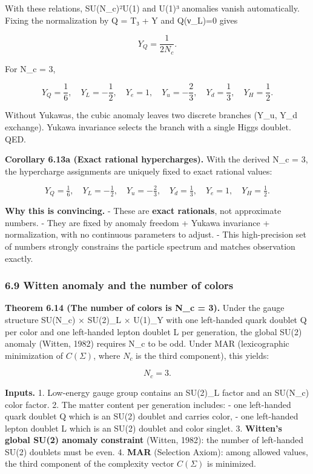 \documentclass[
]{article}
\begin{document}
With these relations, SU(N\_c)²U(1) and U(1)³ anomalies vanish
automatically. Fixing the normalization by Q = T₃ + Y and Q(ν\_L)=0
gives

\[
Y_Q = \frac{1}{2 N_c}.
\]

For N\_c = 3,

\[
Y_Q = \frac{1}{6},\quad Y_L = -\frac{1}{2},\quad Y_e = 1,\quad
Y_u = -\frac{2}{3},\quad Y_d = \frac{1}{3},\quad Y_H = \frac{1}{2}.
\]

Without Yukawas, the cubic anomaly leaves two discrete branches (Y\_u,
Y\_d exchange). Yukawa invariance selects the branch with a single Higgs
doublet. QED.

\textbf{Corollary 6.13a (Exact rational hypercharges).} With the derived
N\_c = 3, the hypercharge assignments are uniquely fixed to exact
rational values:

\[
Y_Q = \tfrac{1}{6}, \quad
Y_L = -\tfrac{1}{2}, \quad
Y_u = -\tfrac{2}{3}, \quad
Y_d = \tfrac{1}{3}, \quad
Y_e = 1, \quad
Y_H = \tfrac{1}{2}.
\]

\textbf{Why this is convincing.} - These are \textbf{exact rationals},
not approximate numbers. - They are fixed by anomaly freedom + Yukawa
invariance + normalization, with no continuous parameters to adjust. -
This high-precision set of numbers strongly constrains the particle
spectrum and matches observation exactly.

\subsubsection{6.9 Witten anomaly and the number of
colors}\label{witten-anomaly-and-the-number-of-colors}

\textbf{Theorem 6.14 (The number of colors is N\_c = 3).} Under the
gauge structure SU(N\_c) × SU(2)\_L × U(1)\_Y with one left-handed quark
doublet Q per color and one left-handed lepton doublet L per generation,
the global SU(2) anomaly (Witten, 1982) requires N\_c to be odd. Under
MAR (lexicographic minimization of \(C(\Sigma)\), where \(N_c\) is the
third component), this yields:

\[
N_c = 3.
\]

\textbf{Inputs.} 1. Low-energy gauge group contains an SU(2)\_L factor
and an SU(N\_c) color factor. 2. The matter content per generation
includes: - one left-handed quark doublet Q which is an SU(2) doublet
and carries color, - one left-handed lepton doublet L which is an SU(2)
doublet and color singlet. 3. \textbf{Witten's global SU(2) anomaly
constraint} (Witten, 1982): the number of left-handed SU(2) doublets
must be even. 4. \textbf{MAR} (Selection Axiom): among allowed values,
the third component of the complexity vector \(C(\Sigma)\) is minimized.
\end{document}
